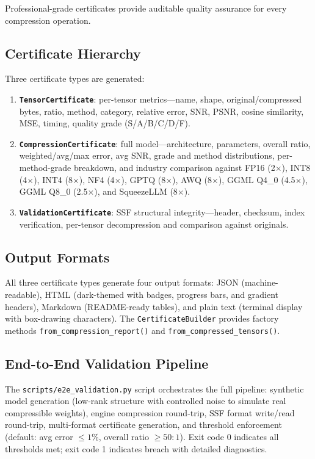 \documentclass[11pt,a4paper,twocolumn]{article}
\begin{document}
Professional-grade certificates provide auditable quality assurance for every compression operation.

\subsection{Certificate Hierarchy}
Three certificate types are generated:

\begin{enumerate}
	\item \textbf{\texttt{TensorCertificate}}: per-tensor metrics---name, shape, original/compressed bytes, ratio, method, category, relative error, SNR, PSNR, cosine similarity, MSE, timing, quality grade (S/A/B/C/D/F).
	\item \textbf{\texttt{CompressionCertificate}}: full model---architecture, parameters, overall ratio, weighted/avg/max error, avg SNR, grade and method distributions, per-method-grade breakdown, and industry comparison against FP16 (2$\times$), INT8 (4$\times$), INT4 (8$\times$), NF4 (4$\times$), GPTQ (8$\times$), AWQ (8$\times$), GGML Q4\_0 (4.5$\times$), GGML Q8\_0 (2.5$\times$), and SqueezeLLM (8$\times$).
	\item \textbf{\texttt{ValidationCertificate}}: SSF structural integrity---header, checksum, index verification, per-tensor decompression and comparison against originals.
\end{enumerate}

\subsection{Output Formats}
All three certificate types generate four output formats: JSON (machine-readable), HTML (dark-themed with badges, progress bars, and gradient headers), Markdown (README-ready tables), and plain text (terminal display with box-drawing characters). The \texttt{CertificateBuilder} provides factory methods \texttt{from\_compression\_report()} and \texttt{from\_compressed\_tensors()}.

\subsection{End-to-End Validation Pipeline}
The \texttt{scripts/e2e\_validation.py} script orchestrates the full pipeline: synthetic model generation (low-rank structure with controlled noise to simulate real compressible weights), engine compression round-trip, SSF format write/read round-trip, multi-format certificate generation, and threshold enforcement (default: avg error $\le 1\%$, overall ratio $\ge 50:1$). Exit code 0 indicates all thresholds met; exit code 1 indicates breach with detailed diagnostics.
\end{document}

